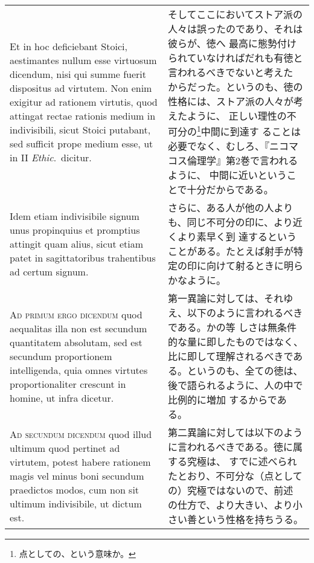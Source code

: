 \documentclass[10pt]{jsarticle}
\begin{document}
\begin{longtable}{p{21em}p{21em}}
\\


 Et in hoc deficiebant Stoici, aestimantes nullum esse
 virtuosum dicendum, nisi qui summe fuerit dispositus ad virtutem. Non
 enim exigitur ad rationem virtutis, quod attingat rectae rationis
 medium in indivisibili, sicut Stoici putabant, sed sufficit prope
 medium esse, ut in II {\itshape Ethic}.~dicitur.
 
&

 そしてここにおいてストア派の人々は誤ったのであり、それは彼らが、徳へ
 最高に態勢付けられていなければだれも有徳と言われるべきでないと考えた
 からだった。というのも、徳の性格には、ストア派の人々が考えたように、
 正しい理性の不可分の\footnote{点としての、という意味か。}中間に到達す
 ることは必要でなく、むしろ、『ニコマコス倫理学』第2巻で言われるように、
 中間に近いということで十分だからである。

\\


 Idem etiam indivisibile signum unus propinquius et promptius attingit
 quam alius, sicut etiam patet in sagittatoribus trahentibus ad certum
 signum.
 
&

 さらに、ある人が他の人よりも、同じ不可分の印に、より近くより素早く到
 達するということがある。たとえば射手が特定の印に向けて射るときに明ら
 かなように。

\\



 {\scshape Ad primum ergo dicendum} quod aequalitas illa non est
 secundum quantitatem absolutam, sed est secundum proportionem
 intelligenda, quia omnes virtutes proportionaliter crescunt in
 homine, ut infra dicetur.


&

 第一異論に対しては、それゆえ、以下のように言われるべきである。かの等
 しさは無条件的な量に即したものではなく、比に即して理解されるべきであ
 る。というのも、全ての徳は、後で語られるように、人の中で比例的に増加
 するからである。

\\

 {\scshape Ad secundum dicendum} quod illud ultimum quod pertinet ad
 virtutem, potest habere rationem magis vel minus boni secundum
 praedictos modos, cum non sit ultimum indivisibile, ut dictum est.
 
&

 第二異論に対しては以下のように言われるべきである。徳に属する究極は、
 すでに述べられたとおり、不可分な（点としての）究極ではないので、前述
 の仕方で、より大きい、より小さい善という性格を持ちうる。


\end{longtable}
\end{document}
